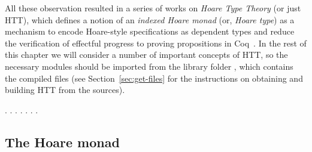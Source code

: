 All these observation resulted in a series of works on \textit{Hoare Type
Theory} (or just HTT), which defines a notion of an \textit{indexed Hoare
monad} (or, \textit{Hoare type}) as a mechanism to encode Hoare-style
specifications as dependent types and reduce the verification of
effectful progress to proving propositions in
Coq~\cite{Nanevski-al:ICFP06,Nanevski-al:JFP08,Nanevski-al:POPL10}.
In the rest of this chapter we will consider a number of important
concepts of HTT, so the necessary modules should be imported from the
library folder , which contains the compiled files (see
Section~\ref{sec:get-files} for the instructions on obtaining and
building HTT from the sources).




\begin{coqdoccode}
\coqdocemptyline
\coqdocnoindent
{} \coqdoceol
\coqdocnoindent
{}       .\coqdoceol
\coqdocnoindent
{} \coqdoceol
\coqdocnoindent
{}      .\coqdoceol
\coqdocnoindent
{} \coqdoceol
\coqdocnoindent
{}     .\coqdoceol
\coqdocemptyline
\coqdocnoindent
{} .\coqdoceol
\coqdocemptyline
\coqdocnoindent
{}.\coqdoceol
\coqdocnoindent
{}  .\coqdoceol
\coqdocnoindent
{}   .\coqdoceol
\coqdocemptyline
\end{coqdoccode}
\subsection{The Hoare monad}


